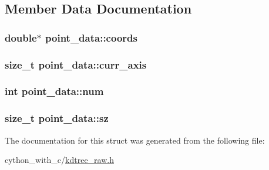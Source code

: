 \subsection{Member Data Documentation}
\hypertarget{structpoint__data_adf36d0d155b6f048bf8b238f6f382852}{
\subsubsection[{coords}]{\setlength{\rightskip}{0pt plus 5cm}double$\ast$ {\bf point\_\-data::coords}}}
\label{structpoint__data_adf36d0d155b6f048bf8b238f6f382852}
\hypertarget{structpoint__data_ab4fdf1640319330eaaa312dc128d15f4}{
\subsubsection[{curr\_\-axis}]{\setlength{\rightskip}{0pt plus 5cm}size\_\-t {\bf point\_\-data::curr\_\-axis}}}
\label{structpoint__data_ab4fdf1640319330eaaa312dc128d15f4}
\hypertarget{structpoint__data_ad644f53aa795445d1f8e2a96f5bbffcd}{
\subsubsection[{num}]{\setlength{\rightskip}{0pt plus 5cm}int {\bf point\_\-data::num}}}
\label{structpoint__data_ad644f53aa795445d1f8e2a96f5bbffcd}
\hypertarget{structpoint__data_a0a8a39666c3f29a7ba173e05637798d7}{
\subsubsection[{sz}]{\setlength{\rightskip}{0pt plus 5cm}size\_\-t {\bf point\_\-data::sz}}}
\label{structpoint__data_a0a8a39666c3f29a7ba173e05637798d7}


The documentation for this struct was generated from the following file:\begin{DoxyCompactItemize}
\item 
cython\_\-with\_\-c/\hyperlink{kdtree__raw_8h}{kdtree\_\-raw.h}\end{DoxyCompactItemize}
